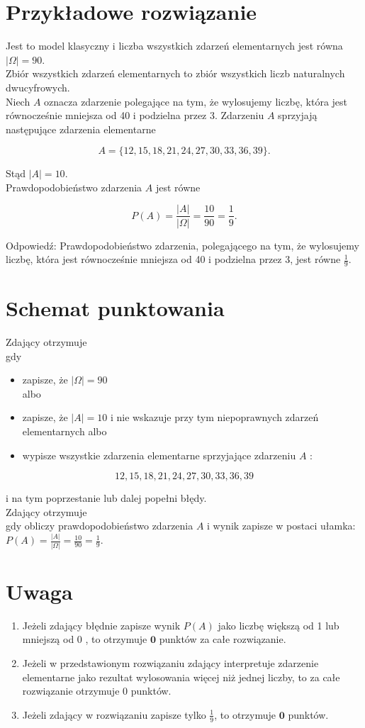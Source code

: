 \documentclass[10pt]{article}
\begin{document}
\section*{Przykładowe rozwiązanie}
Jest to model klasyczny i liczba wszystkich zdarzeń elementarnych jest równa $|\Omega|=90$.\\
Zbiór wszystkich zdarzeń elementarnych to zbiór wszystkich liczb naturalnych dwucyfrowych.\\
Niech $A$ oznacza zdarzenie polegające na tym, że wylosujemy liczbę, która jest równocześnie mniejsza od 40 i podzielna przez 3. Zdarzeniu $A$ sprzyjają następujące zdarzenia elementarne

$$
A=\{12,15,18,21,24,27,30,33,36,39\} .
$$

Stąd $|A|=10$.\\
Prawdopodobieństwo zdarzenia $A$ jest równe

$$
P(A)=\frac{|A|}{|\Omega|}=\frac{10}{90}=\frac{1}{9} .
$$

Odpowiedź: Prawdopodobieństwo zdarzenia, polegającego na tym, że wylosujemy liczbę, która jest równocześnie mniejsza od 40 i podzielna przez 3, jest równe $\frac{1}{9}$.

\section*{Schemat punktowania}
Zdający otrzymuje\\
gdy

\begin{itemize}
  \item zapisze, że $|\Omega|=90$\\
albo
  \item zapisze, że $|A|=10$ i nie wskazuje przy tym niepoprawnych zdarzeń elementarnych albo
  \item wypisze wszystkie zdarzenia elementarne sprzyjające zdarzeniu $A$ :
\end{itemize}

$$
12,15,18,21,24,27,30,33,36,39
$$

i na tym poprzestanie lub dalej popełni błędy.\\
Zdający otrzymuje\\
gdy obliczy prawdopodobieństwo zdarzenia $A$ i wynik zapisze w postaci ułamka:\\
$P(A)=\frac{|A|}{|\Omega|}=\frac{10}{90}=\frac{1}{9}$.

\section*{Uwaga}
\begin{enumerate}
  \item Jeżeli zdający błędnie zapisze wynik $P(A)$ jako liczbę większą od 1 lub mniejszą od 0 , to otrzymuje $\mathbf{0}$ punktów za całe rozwiązanie.
  \item Jeżeli w przedstawionym rozwiązaniu zdający interpretuje zdarzenie elementarne jako rezultat wylosowania więcej niż jednej liczby, to za całe rozwiązanie otrzymuje 0 punktów.
  \item Jeżeli zdający w rozwiązaniu zapisze tylko $\frac{1}{9}$, to otrzymuje $\mathbf{0}$ punktów.
\end{enumerate}
\end{document}
